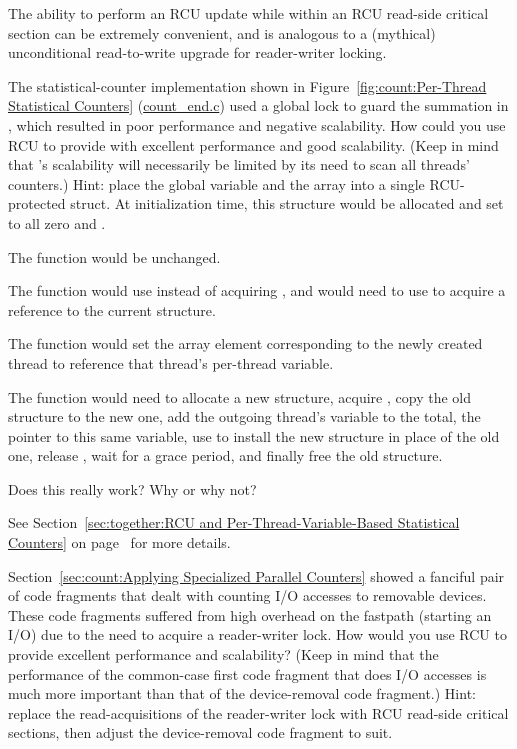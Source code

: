 \begin{enumerate}
	The ability to perform an RCU update while within an RCU read-side
	critical section can be extremely convenient, and is analogous
	to a (mythical) unconditional read-to-write upgrade for
	reader-writer locking.

\QuickQ{}
	The statistical-counter implementation shown in
	Figure~\ref{fig:count:Per-Thread Statistical Counters}
	(\url{count_end.c})
	used a global lock to guard the summation in ,
	which resulted in poor performance and negative scalability.
	How could you use RCU to provide  with
	excellent performance and good scalability.
	(Keep in mind that 's scalability will
	necessarily be limited by its need to scan all threads'
	counters.)
\QuickA{}
	Hint: place the global variable  and the
	array  into a single RCU-protected struct.
	At initialization time, this structure would be allocated
	and set to all zero and .

	The  function would be unchanged.

	The  function would use 
	instead of acquiring , and would need to
	use  to acquire a reference to the
	current structure.

	The  function would set the
	array element corresponding to the newly created thread
	to reference that thread's per-thread  variable.

	The  function would need to
	allocate a new structure, acquire ,
	copy the old structure to the new one, add the outgoing
	thread's  variable to the total, 
	the pointer to this same  variable,
	use  to install the new structure
	in place of the old one, release ,
	wait for a grace period, and finally free the old structure.

	Does this really work?
	Why or why not?

	See
	Section~\ref{sec:together:RCU and Per-Thread-Variable-Based Statistical Counters}
	on
	page~\pageref{sec:together:RCU and Per-Thread-Variable-Based Statistical Counters}
	for more details.

\QuickQ{}
	Section~\ref{sec:count:Applying Specialized Parallel Counters}
	showed a fanciful pair of code fragments that dealt with counting
	I/O accesses to removable devices.
	These code fragments suffered from high overhead on the fastpath
	(starting an I/O) due to the need to acquire a reader-writer
	lock.
	How would you use RCU to provide excellent performance and
	scalability?
	(Keep in mind that the performance of the common-case first
	code fragment that does I/O accesses is much more important
	than that of the device-removal code fragment.)
\QuickA{}
	Hint: replace the read-acquisitions of the reader-writer lock
	with RCU read-side critical sections, then adjust the
	device-removal code fragment to suit.


\end{enumerate}

